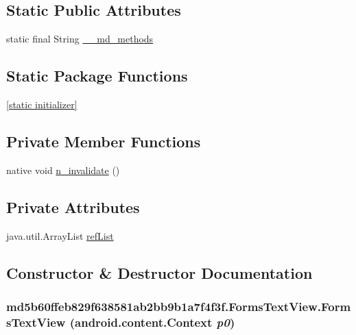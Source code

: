 \subsection*{Static Public Attributes}
\begin{CompactItemize}
\item 
static final String \hyperlink{classmd5b60ffeb829f638581ab2bb9b1a7f4f3f_1_1_forms_text_view_d4f9b582e68f2509120a1f5414c09541}{\_\-\_\-md\_\-methods}
\end{CompactItemize}
\subsection*{Static Package Functions}
\begin{CompactItemize}
\item 
\hyperlink{classmd5b60ffeb829f638581ab2bb9b1a7f4f3f_1_1_forms_text_view_01f43bb9e6772e31457f7a6ecd45ba1f}{\mbox{[}static initializer\mbox{]}}
\end{CompactItemize}
\subsection*{Private Member Functions}
\begin{CompactItemize}
\item 
native void \hyperlink{classmd5b60ffeb829f638581ab2bb9b1a7f4f3f_1_1_forms_text_view_89dfc7b60d01058537f74b9c0b254c12}{n\_\-invalidate} ()
\end{CompactItemize}
\subsection*{Private Attributes}
\begin{CompactItemize}
\item 
java.util.ArrayList \hyperlink{classmd5b60ffeb829f638581ab2bb9b1a7f4f3f_1_1_forms_text_view_3da090ab0eccaeff99e949ea5d81c1b2}{refList}
\end{CompactItemize}


\subsection{Constructor \& Destructor Documentation}
\hypertarget{classmd5b60ffeb829f638581ab2bb9b1a7f4f3f_1_1_forms_text_view_afad6c761c1d359ba5d9ba2e7d58f6a6}{
\subsubsection[{FormsTextView}]{\setlength{\rightskip}{0pt plus 5cm}md5b60ffeb829f638581ab2bb9b1a7f4f3f.FormsTextView.FormsTextView (android.content.Context {\em p0})}}
\label{classmd5b60ffeb829f638581ab2bb9b1a7f4f3f_1_1_forms_text_view_afad6c761c1d359ba5d9ba2e7d58f6a6}


